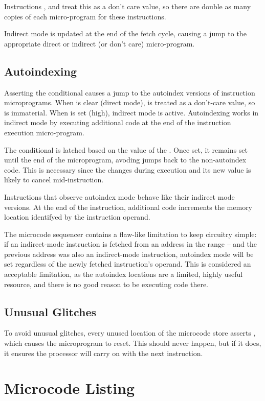 Instructions ,  and  treat this as a don't
care value, so there are double as many copies of each micro-program
for these instructions.

Indirect mode is updated at the end of the fetch cycle, causing a jump
to the appropriate direct or indirect (or don't care) micro-program.

\subsection{Autoindexing}

Asserting the  conditional causes a jump to the autoindex
versions of instruction microprograms. When  is clear (direct
mode),  is treated as a don't-care value, so is
immaterial. When  is set (high), indirect mode is
active. Autoindexing works in indirect mode by executing additional
code at the end of the instruction execution micro-program.

The  conditional is latched based on the value of the
\AR{}. Once set, it remains set until the end of the microprogram,
avoding jumps back to the non-autoindex code. This is necessary since
the \AR{} changes during execution and its new value is likely to
cancel  mid-instruction.

Instructions that observe autoindex mode behave like their indirect
mode versions. At the end of the instruction, additional code
increments the memory location identifyed by the instruction operand.

The microcode sequencer contains a flaw-like limitation to keep
circuitry simple: if an indirect-mode instruction is fetched from an
address in the range – and the previous address
was also an indirect-mode instruction, autoindex mode will be set
regardless of the newly fetched instruction's operand. This is
considered an acceptable limitation, as the autoindex locations are a
limited, highly useful resource, and there is no good reason to be
executing code there.

\subsection{Unusual Glitches}

To avoid unusual glitches, every unused location of the microcode
store asserts , which causes the microprogram to reset. This
should never happen, but if it does, it ensures the processor will
carry on with the next instruction.

\section{Microcode Listing}


